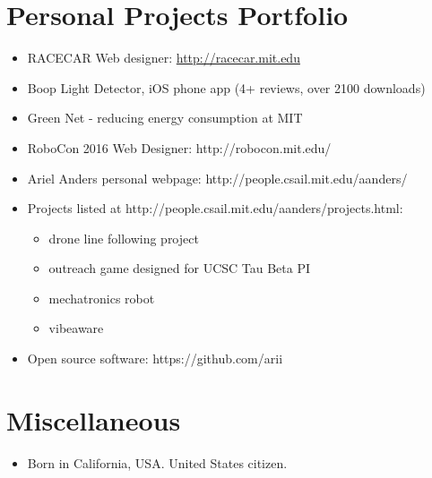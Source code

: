 \documentclass[10pt,letterpaper]{article}
\begin{document}
\section*{Personal Projects Portfolio}
\begin{itemize}
\item RACECAR Web designer: \url{http://racecar.mit.edu}
\item Boop Light Detector, iOS phone app (4+ reviews, over 2100 downloads)
\item Green Net - reducing energy consumption at MIT
\item RoboCon 2016 Web Designer: http://robocon.mit.edu/
\item Ariel Anders personal webpage: http://people.csail.mit.edu/aanders/
\item Projects listed at http://people.csail.mit.edu/aanders/projects.html:
\begin{itemize}
\item drone line following project
\item outreach game designed for UCSC Tau Beta PI
\item mechatronics robot
\item vibeaware
\end{itemize}
\item Open source software: https://github.com/arii
\end{itemize}

\section*{Miscellaneous}

\begin{itemize}
\item Born in California, USA. United States citizen.
\end{itemize}
\end{document}
